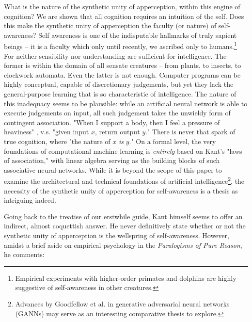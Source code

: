 
What is the nature of the synthetic unity of apperception, within this engine of cognition? We are shown that all cognition requires an intuition of the self. Does this make the synthetic unity of apperception the faculty (or nature) of self-awareness? Self awareness is one of the indisputable hallmarks of truly sapient beings -- it is a faculty which only until recently, we ascribed only to humans.\footnote{Empirical experiments with higher-order primates and dolphins are highly suggestive of self-awareness in other creatures.} For neither sensibility nor understanding are sufficient for intelligence. The former is within the domain of all sensate creatures -- from plants, to insects, to clockwork automata. Even the latter is not enough. Computer programs can be highly conceptual, capable of discretionary judgements, but yet they lack the general-purpose learning that is so characteristic of intelligence. The nature of this inadequacy seems to be plausible: while an artificial neural network is able to execute judgements on input, all such judgement takes the unwieldy form of contingent association. "When I support a body, then I feel a pressure of heaviness" \autocite[B143]{hackett}, v.s. "given input $x$, return output $y$." There is never that spark of true cognition, where "the nature of $x$ \emph{is} $y$." On a formal level, the very foundations of computational machine learning is \emph{entirely} based on Kant's "laws of association," with linear algebra serving as the building blocks of such associative neural networks. While it is beyond the scope of this paper to examine the architectural and technical foundations of artificial intelligence\footnote{Advances by Goodfellow et al. in generative adversarial neural networks (GANNs) may serve as an interesting comparative thesis to explore.}, the necessity of the synthetic unity of apperception for self-awareness is a thesis as intriguing indeed.

\noindent
Going back to the treatise of our erstwhile guide, Kant himself seems to offer an indirect, almost coquettish answer. He never definitively state whether or not the synthetic unity of apperception is the wellspring of self-awareness. However, amidst a brief aside on empirical psychology in the \emph{Paralogisms of Pure Reason}, he comments:

